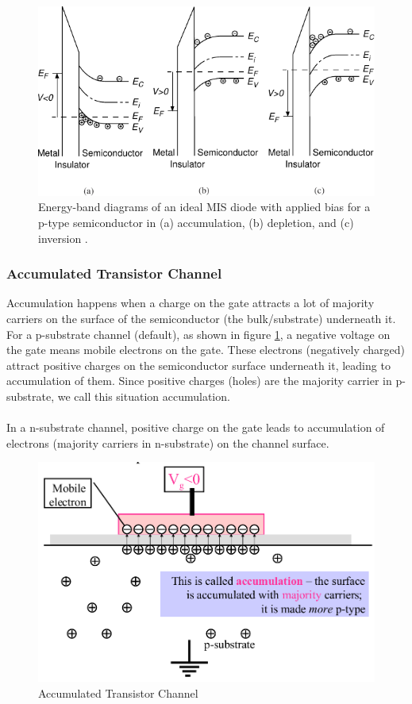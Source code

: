 \documentclass[main]{subfiles}
\begin{document}
\begin{figure}[H]
\centering
  \includegraphics[scale=1]{figs/operation_domains2.pdf}
  \caption{Energy-band diagrams of an ideal MIS diode with applied bias for a p-type semiconductor in (a) accumulation, (b) depletion, and (c) inversion \cite{book:VLSI}.}
\end{figure}

\subsubsection{Accumulated Transistor Channel}
Accumulation happens when a charge on the gate attracts a lot of majority carriers on the surface of the semiconductor (the bulk/substrate) underneath it.\\
For a p-substrate channel (default), as shown in figure \ref{fig:channel_accumulated}, a negative voltage on the gate means mobile electrons on the gate. These electrons (negatively charged) attract positive charges on the semiconductor surface underneath it, leading to accumulation of them. Since positive charges (holes) are the majority carrier in p-substrate, we call this situation accumulation.\\\\
In a n-substrate channel, positive charge on the gate leads to accumulation of electrons (majority carriers in n-substrate) on the channel surface.
\begin{figure}[H]
  \centering
  \includegraphics[scale=1]{figs/channel_accumulation.png}
  \caption{Accumulated Transistor Channel \cite{lec2}}
  \label{fig:channel_accumulated}
\end{figure}
\end{document}
